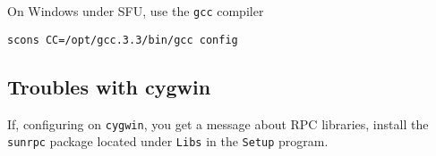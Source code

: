 On Windows under SFU, use the \texttt{gcc} compiler
\begin{verbatim}
scons CC=/opt/gcc.3.3/bin/gcc config
\end{verbatim}

\subsection{Troubles with cygwin}
If, configuring on \texttt{cygwin}, you get a message about RPC
libraries, install the \texttt{sunrpc} package located under
\texttt{Libs} in the \texttt{Setup} program.

%

